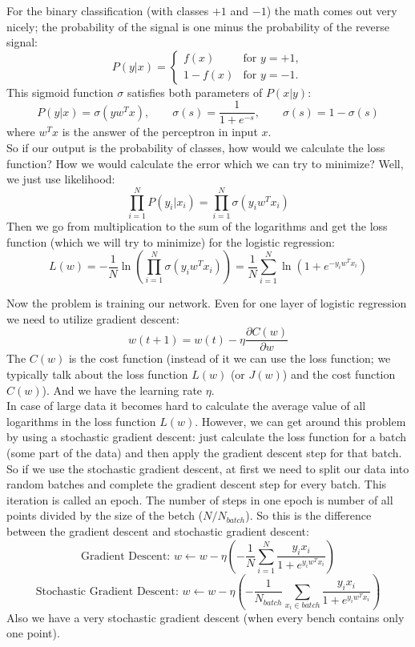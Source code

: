 For the binary classification (with classes $+1$ and $-1$) the math comes out very nicely; the probability of the signal is one minus the probability of the reverse signal:
$$P(y|x)=\begin{cases}
f(x)&\text{for }y=+1,\\
1-f(x)&\text{for }y=-1.
\end{cases}$$
This sigmoid function $\sigma$ satisfies both parameters of $P(x|y)$:
$$P(y|x)=\sigma(yw^Tx),\qquad\sigma(s)=\frac{1}{1+e^{-s}},\qquad \sigma(s)=1-\sigma(s)$$
where $w^Tx$ is the answer of the perceptron in input $x$.\\
So if our output is the probability of classes, how would we calculate the loss function? How we would calculate the error which we can try to minimize? Well, we just use likelihood:
$$\prod\limits_{i=1}^{N}P(y_i|x_i)=\prod\limits_{i=1}^{N}\sigma(y_iw^Tx_i)$$
Then we go from multiplication to the sum of the logarithms and get the loss function (which we will try to minimize) for the logistic regression:
$$L(w)=-\frac{1}{N}\ln\left(\prod\limits_{i=1}^N\sigma(y_iw^Tx_i)\right)=\frac{1}{N}\sum\limits_{i=1}^N\ln(1+e^{-y_iw^Tx_i})$$

Now the problem is training our network. Even for one layer of logistic regression we need to utilize gradient descent:
$$w(t+1)=w(t)-\eta\frac{\partial C(w)}{\partial w}$$
The $C(w)$ is the cost function (instead of it we can use the loss function; we typically talk about the loss function $L(w)$ (or $J(w)$) and the cost function $C(w)$). And we have the learning rate $\eta$.\\
In case of large data it becomes hard to calculate the average value of all logarithms in the loss function $L(w)$. However, we can get around this problem by using a stochastic gradient descent: just calculate the loss function for a batch (some part of the data) and then apply the gradient descent step for that batch. So if we use the stochastic gradient descent, at first we need to split our data into random batches and complete the gradient descent step for every batch. This iteration is called an epoch. The number of steps in one epoch is number of all points divided by the size of the betch ($N / N_{batch}$).
So this is the difference between the gradient descent and stochastic gradient descent:
$$\text{Gradient Descent: }w\leftarrow w-\eta\left(-\frac{1}{N}\sum\limits_{i=1}^N\frac{y_ix_i}{1+e^{y_iw^Tx_i}}\right)$$
$$\text{Stochastic Gradient Descent: }w\leftarrow w-\eta\left(-\frac{1}{N_{batch}}\sum\limits_{x_i\in batch}\frac{y_ix_i}{1+e^{y_iw^Tx_i}}\right)$$
Also we have a very stochastic gradient descent (when every bench contains only one point).\\
{\it <The reason why very stochastic gradient descent is not the best way>}

